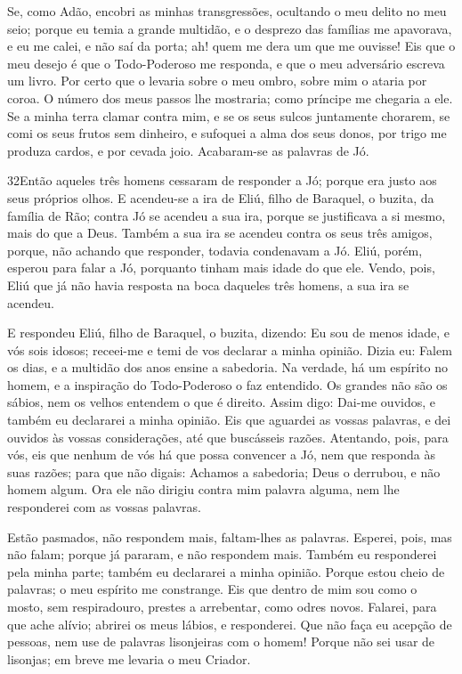 Se, como Adão, encobri as minhas transgressões, ocultando o meu
delito no meu seio; porque eu temia a grande multidão, e o
desprezo das famílias me apavorava, e eu me calei, e não saí da
porta; ah! quem me dera um que me ouvisse! Eis que o meu
desejo é que o Todo-Poderoso me responda, e que o meu adversário
escreva um livro. Por certo que o levaria sobre o meu ombro,
sobre mim o ataria por coroa. O número dos meus passos lhe
mostraria; como príncipe me chegaria a ele. Se a minha terra
clamar contra mim, e se os seus sulcos juntamente chorarem,
se comi os seus frutos sem dinheiro, e sufoquei a alma dos
seus donos, por trigo me produza cardos, e por cevada joio.
Acabaram-se as palavras de Jó.

\medskip

\lettrine{32} Então aqueles três homens cessaram de responder
a Jó; porque era justo aos seus próprios olhos. E acendeu-se a
ira de Eliú, filho de Baraquel, o buzita, da família de Rão; contra
Jó se acendeu a sua ira, porque se justificava a si mesmo, mais do
que a Deus. Também a sua ira se acendeu contra os seus três
amigos, porque, não achando que responder, todavia condenavam a Jó.
Eliú, porém, esperou para falar a Jó, porquanto tinham mais
idade do que ele. Vendo, pois, Eliú que já não havia resposta na
boca daqueles três homens, a sua ira se acendeu.

E respondeu Eliú, filho de Baraquel, o buzita, dizendo: Eu sou de
menos idade, e vós sois idosos; receei-me e temi de vos declarar a
minha opinião. Dizia eu: Falem os dias, e a multidão dos anos
ensine a sabedoria. Na verdade, há um espírito no homem, e a
inspiração do Todo-Poderoso o faz entendido. Os grandes não são
os sábios, nem os velhos entendem o que é direito. Assim
digo: Dai-me ouvidos, e também eu declararei a minha opinião.
Eis que aguardei as vossas palavras, e dei ouvidos às vossas
considerações, até que buscásseis razões. Atentando, pois,
para vós, eis que nenhum de vós há que possa convencer a Jó, nem que
responda às suas razões; para que não digais: Achamos a
sabedoria; Deus o derrubou, e não homem algum. Ora ele não
dirigiu contra mim palavra alguma, nem lhe responderei com as vossas
palavras.

Estão pasmados, não respondem mais, faltam-lhes as palavras.
Esperei, pois, mas não falam; porque já pararam, e não
respondem mais. Também eu responderei pela minha parte;
também eu declararei a minha opinião. Porque estou cheio de
palavras; o meu espírito me constrange. Eis que dentro de mim
sou como o mosto, sem respiradouro, prestes a arrebentar, como odres
novos. Falarei, para que ache alívio; abrirei os meus lábios,
e responderei. Que não faça eu acepção de pessoas, nem use de
palavras lisonjeiras com o homem! Porque não sei usar de
lisonjas; em breve me levaria o meu Criador.

